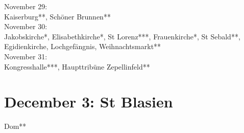 November 29:\\
Kaiserburg**, Sch\"oner Brunnen**\\

November 30:\\
Jakobskirche*, Elisabethkirche*, St Lorenz***, Frauenkirche*, St Sebald**, Egidienkirche, Lochgef\"angnis, Weihnachtsmarkt**\\

November 31:\\
Kongresshalle***, Haupttrib\"une Zepellinfeld**

\section{December 3: St Blasien}
\label{2008:StBlasien}

Dom**
